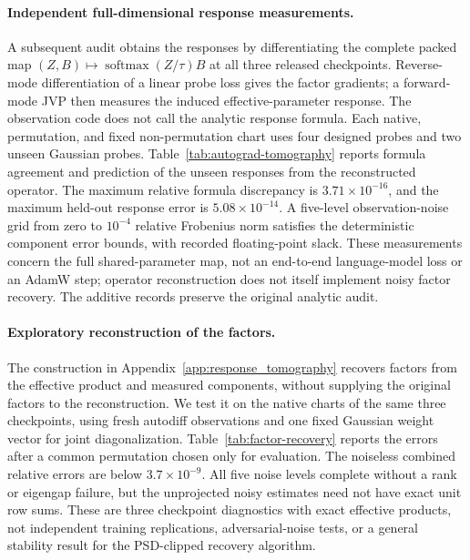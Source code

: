 \paragraph{Independent full-dimensional response measurements.}
A subsequent audit obtains the responses by differentiating the complete
packed map $(Z,B)\mapsto\operatorname{softmax}(Z/\tau)B$ at all three
released checkpoints. Reverse-mode differentiation of a linear probe loss
gives the factor gradients; a forward-mode JVP then measures the induced
effective-parameter response. The observation code does not call the analytic
response formula. Each native, permutation, and fixed non-permutation chart
uses four designed probes and two unseen Gaussian probes.
Table~\ref{tab:autograd-tomography} reports formula agreement and prediction of
the unseen responses from the reconstructed operator. The maximum relative
formula discrepancy is $3.71\times10^{-16}$, and the maximum held-out response
error is $5.08\times10^{-14}$. A five-level observation-noise grid from zero
to $10^{-4}$ relative Frobenius norm satisfies the deterministic component
error bounds, with recorded floating-point slack. These measurements concern
the full shared-parameter map, not an end-to-end language-model loss or an
AdamW step; operator reconstruction does not itself implement noisy factor
recovery. The additive records preserve the original analytic audit.



\paragraph{Exploratory reconstruction of the factors.}
The construction in Appendix~\ref{app:response_tomography} recovers factors
from the effective product and measured components, without supplying the
original factors to the reconstruction. We test it on the native charts of
the same three checkpoints, using fresh autodiff observations and one fixed
Gaussian weight vector for joint diagonalization. Table~\ref{tab:factor-recovery}
reports the errors after a common permutation chosen only for evaluation.
The noiseless combined relative errors are below $3.7\times10^{-9}$.
All five noise levels complete without a rank or eigengap failure, but the
unprojected noisy estimates need not have exact unit row sums. These are
three checkpoint diagnostics with exact effective products, not independent
training replications, adversarial-noise tests, or a general stability result
for the PSD-clipped recovery algorithm.

